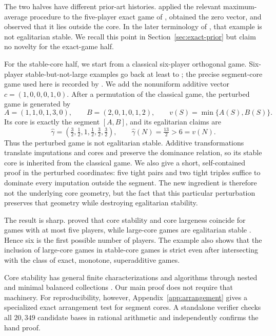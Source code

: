 \documentclass[11pt]{article}
\begin{document}
The two halves have different prior-art histories.
\citet[][Example~5]{Mauri2017} applied the relevant maximum-average procedure
to the five-player exact game of \citet{Biswas1999}, obtained the zero vector,
and observed that it lies outside the core. In the later terminology of
\citet{Dietzenbacher2021}, that example is not egalitarian stable. We recall
this point in Section~\ref{sec:exact-prior} but claim no novelty for the
exact-game half.

For the stable-core half, we start from a classical six-player orthogonal
game. Six-player stable-but-not-large examples go back at least to
\citet{Biswas2001}; the precise segment-core game used here is recorded by
\citet[][Example~4.3]{Shellshear2009}. We add the nonuniform additive vector
$c=(1,0,0,0,1,0)$. After a permutation of the classical game, the perturbed
game is generated by
\[
 A=(1,1,0,1,3,0),\qquad B=(2,0,1,0,1,2),\qquad
 v(S)=\min\{A(S),B(S)\}.
\]
Its core is exactly the segment $[A,B]$, and its egalitarian claims are
\[
 \widehat\gamma
   =\left(\tfrac32,\tfrac12,1,\tfrac12,\tfrac32,\tfrac32\right),
 \qquad
 \widehat\gamma(N)=\tfrac{13}{2}>6=v(N).
\]
Thus the perturbed game is not egalitarian stable. Additive transformations
translate imputations and cores and preserve the dominance relation, so its
stable core is inherited from the classical game. We also give a short,
self-contained proof in the perturbed coordinates: five tight pairs and two
tight triples suffice to dominate every imputation outside the segment. The
new ingredient is therefore not the underlying core geometry, but the fact
that this particular perturbation preserves that geometry while destroying
egalitarian stability.

The result is sharp. \citet{Estevez2012} proved that core stability and core
largeness coincide for games with at most five players, while large-core games
are egalitarian stable \citep{Dietzenbacher2021}. Hence six is the first
possible number of players. The example also shows that the inclusion of
large-core games in stable-core games is strict even after intersecting with
the class of exact, monotone, superadditive games.

Core stability has general finite characterizations and algorithms through
nested and minimal balanced collections
\citep{GrabischSudholter2024,LaplaceMermoud2023}. Our main proof does not
require that machinery. For reproducibility, however,
Appendix~\ref{app:arrangement} gives a specialized exact arrangement test for
segment cores. A standalone verifier checks all $20{,}349$ candidate bases in
rational arithmetic and independently confirms the hand proof.
\end{document}
